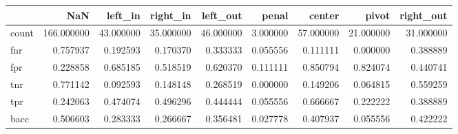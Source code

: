 \begin{tabular}{lrrrrrrrr}
\toprule
{} &         NaN &    left\_in &   right\_in &   left\_out &     penal &     center &      pivot &  right\_out \\
\midrule
count &  166.000000 &  43.000000 &  35.000000 &  46.000000 &  3.000000 &  57.000000 &  21.000000 &  31.000000 \\
fnr   &    0.757937 &   0.192593 &   0.170370 &   0.333333 &  0.055556 &   0.111111 &   0.000000 &   0.388889 \\
fpr   &    0.228858 &   0.685185 &   0.518519 &   0.620370 &  0.111111 &   0.850794 &   0.824074 &   0.440741 \\
tnr   &    0.771142 &   0.092593 &   0.148148 &   0.268519 &  0.000000 &   0.149206 &   0.064815 &   0.559259 \\
tpr   &    0.242063 &   0.474074 &   0.496296 &   0.444444 &  0.055556 &   0.666667 &   0.222222 &   0.388889 \\
bacc  &    0.506603 &   0.283333 &   0.266667 &   0.356481 &  0.027778 &   0.407937 &   0.055556 &   0.422222 \\
\bottomrule
\end{tabular}
